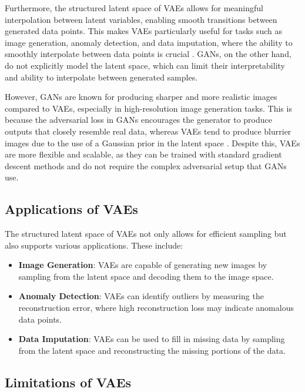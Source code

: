 Furthermore, the structured latent space of VAEs allows for meaningful interpolation between latent variables, enabling smooth transitions between generated data points. This makes VAEs particularly useful for tasks such as image generation, anomaly detection, and data imputation, where the ability to smoothly interpolate between data points is crucial \citep{10.1088/2632-2153/ab80b7}\citep{10.48550/arxiv.2002.10464}. GANs, on the other hand, do not explicitly model the latent space, which can limit their interpretability and ability to interpolate between generated samples.

However, GANs are known for producing sharper and more realistic images compared to VAEs, especially in high-resolution image generation tasks. This is because the adversarial loss in GANs encourages the generator to produce outputs that closely resemble real data, whereas VAEs tend to produce blurrier images due to the use of a Gaussian prior in the latent space \citep{10.1109/access.2020.2977671}. Despite this, VAEs are more flexible and scalable, as they can be trained with standard gradient descent methods and do not require the complex adversarial setup that GANs use.

\subsection{Applications of VAEs}

The structured latent space of VAEs not only allows for efficient sampling but also supports various applications. These include:
\begin{itemize}
    \item \textbf{Image Generation}: VAEs are capable of generating new images by sampling from the latent space and decoding them to the image space.
    \item \textbf{Anomaly Detection}: VAEs can identify outliers by measuring the reconstruction error, where high reconstruction loss may indicate anomalous data points.
    \item \textbf{Data Imputation}: VAEs can be used to fill in missing data by sampling from the latent space and reconstructing the missing portions of the data.
\end{itemize}

\subsection{Limitations of VAEs}

